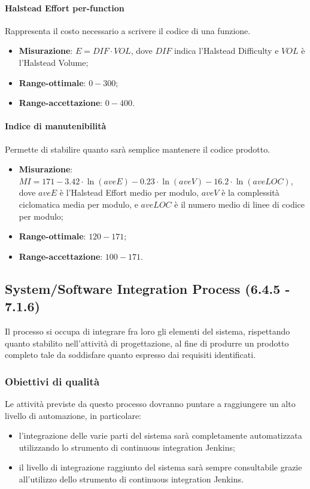 \paragraph{Halstead Effort per-function}
Rappresenta il costo necessario a scrivere il codice di una funzione.
\begin{itemize}
\item \textbf{Misurazione}: $E = DIF \cdot VOL$, dove $DIF$ indica l'Halstead Difficulty e $VOL$ è l'Halstead Volume;
\item \textbf{Range-ottimale}: $0 - 300$;
\item \textbf{Range-accettazione}: $0 - 400$.
\end{itemize}
\paragraph{Indice di manutenibilità}
Permette di stabilire quanto sarà semplice mantenere il codice prodotto.
\begin{itemize}
\item \textbf{Misurazione}: $MI = 171 - 3.42 \cdot \ln(aveE) - 0.23 \cdot \ln(aveV) - 16.2 \cdot \ln(aveLOC)$, dove $aveE$ è l'Halstead Effort medio per modulo, $aveV$ è la complessità ciclomatica media per modulo, e $aveLOC$ è il numero medio di linee di codice per modulo;
\item \textbf{Range-ottimale}: $120 - 171$;
\item \textbf{Range-accettazione}: $100 - 171$.
\end{itemize}

\subsection{System/Software Integration Process (6.4.5 - 7.1.6)}
Il processo si occupa di integrare fra loro gli elementi del sistema, rispettando quanto stabilito nell'attività di progettazione, al fine di produrre un prodotto completo tale da soddisfare quanto espresso dai requisiti identificati.
\subsubsection{Obiettivi di qualità}
Le attività previste da questo processo dovranno puntare a raggiungere un alto livello di automazione, in particolare:
\begin{itemize}
\item l'integrazione delle varie parti del sistema sarà completamente automatizzata utilizzando lo strumento di continuous integration Jenkins;
\item il livello di integrazione raggiunto del sistema sarà sempre consultabile grazie all'utilizzo dello strumento di continuous integration Jenkins.
\end{itemize}
